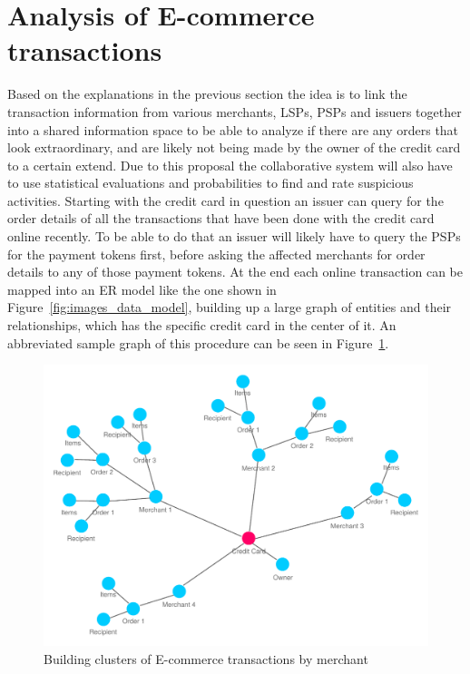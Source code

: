 
\section{Analysis of \gls{E-commerce} transactions}
\label{sec:analyze_transactions}

Based on the explanations in the previous section the idea is to link the transaction information from various merchants, \gls{LSP}s, \gls{PSP}s and issuers together into a shared information space to be able to analyze if there are any orders that look extraordinary, and are likely not being made by the owner of the credit card to a certain extend. Due to this proposal the collaborative system will also have to use statistical evaluations and probabilities to find and rate suspicious activities. Starting with the credit card in question an issuer can query for the order details of all the transactions that have been done with the credit card online recently. To be able to do that an issuer will likely have to query the \gls{PSP}s for the payment tokens first, before asking the affected merchants for order details to any of those payment tokens. At the end each online transaction can be mapped into an \gls{ER} model like the one shown in Figure~\ref{fig:images_data_model}, building up a large graph of entities and their relationships, which has the specific credit card in the center of it. An abbreviated sample graph of this procedure can be seen in Figure~\ref{fig:images_credit_card_graph}. \@

\begin{figure}[H]
  \centering
  \includegraphics[width=0.9\columnwidth]{images/ontology_scenario_2.pdf}
  \caption{Building clusters of E-commerce transactions by merchant}
\label{fig:images_credit_card_graph}
\end{figure}

